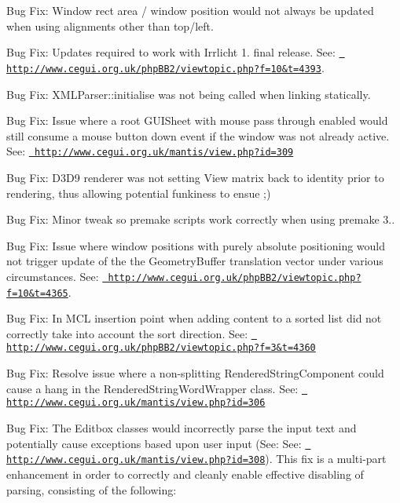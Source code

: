 \begin{DoxyItemize}
\item Bug Fix\+: Window rect area / window position would not always be updated when using alignments other than top/left.
\item Bug Fix\+: Updates required to work with Irrlicht 1. final release. See\+: \href{http://www.cegui.org.uk/phpBB2/viewtopic.php?f=10&t=4393}{\texttt{ http\+://www.\+cegui.\+org.\+uk/php\+B\+B2/viewtopic.\+php?f=10\&t=4393}}.
\item Bug Fix\+: X\+M\+L\+Parser\+::initialise was not being called when linking statically.
\item Bug Fix\+: Issue where a root G\+U\+I\+Sheet with mouse pass through enabled would still consume a mouse button down event if the window was not already active. See\+: \href{http://www.cegui.org.uk/mantis/view.php?id=309}{\texttt{ http\+://www.\+cegui.\+org.\+uk/mantis/view.\+php?id=309}}
\item Bug Fix\+: D3\+D9 renderer was not setting View matrix back to identity prior to rendering, thus allowing potential funkiness to ensue ;)
\item Bug Fix\+: Minor tweak so premake scripts work correctly when using premake 3..
\item Bug Fix\+: Issue where window positions with purely absolute positioning would not trigger update of the the Geometry\+Buffer translation vector under various circumstances. See\+: \href{http://www.cegui.org.uk/phpBB2/viewtopic.php?f=10&t=4365}{\texttt{ http\+://www.\+cegui.\+org.\+uk/php\+B\+B2/viewtopic.\+php?f=10\&t=4365}}.
\item Bug Fix\+: In M\+CL insertion point when adding content to a sorted list did not correctly take into account the sort direction. See\+: \href{http://www.cegui.org.uk/phpBB2/viewtopic.php?f=3&t=4360}{\texttt{ http\+://www.\+cegui.\+org.\+uk/php\+B\+B2/viewtopic.\+php?f=3\&t=4360}}
\item Bug Fix\+: Resolve issue where a non-\/splitting Rendered\+String\+Component could cause a hang in the Rendered\+String\+Word\+Wrapper class. See\+: \href{http://www.cegui.org.uk/mantis/view.php?id=306}{\texttt{ http\+://www.\+cegui.\+org.\+uk/mantis/view.\+php?id=306}}
\item Bug Fix\+: The Editbox classes would incorrectly parse the input text and potentially cause exceptions based upon user input (See\+: See\+: \href{http://www.cegui.org.uk/mantis/view.php?id=308}{\texttt{ http\+://www.\+cegui.\+org.\+uk/mantis/view.\+php?id=308}}). This fix is a multi-\/part enhancement in order to correctly and cleanly enable effective disabling of parsing, consisting of the following\+:

\end{DoxyItemize}
